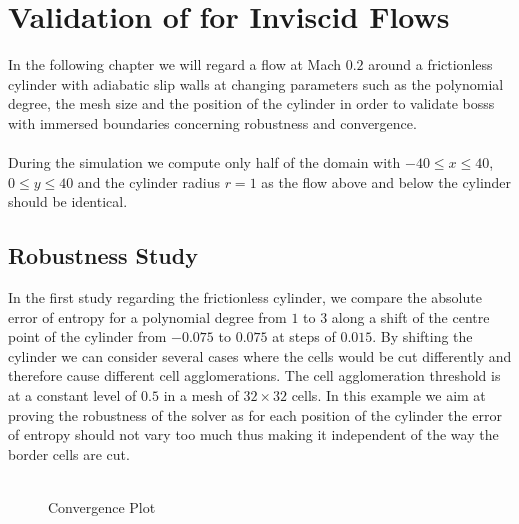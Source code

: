 \chapter{Validation of  for Inviscid Flows}
	\label{eulerVerification}
	In the following chapter we will regard a flow at Mach $0.2$ around a frictionless cylinder with adiabatic slip walls at changing parameters such as the polynomial degree, the mesh size and the position of the cylinder in order to validate \gls{bosss} with immersed boundaries concerning robustness and convergence.\\\\
	During the simulation we compute only half of the domain with $-40 \leq x \leq 40$, $0 \leq y \leq 40$ and the cylinder radius $r = 1$ as the flow above and below the cylinder should be identical.
	\section{Robustness Study}
	In the first study regarding the frictionless cylinder, we compare the absolute error of entropy for a polynomial degree from $1$ to $3$ along a shift of the centre point of the cylinder from $-0.075$ to $0.075$ at steps of $0.015$. By shifting the cylinder we can consider several cases where the cells would be cut differently and therefore cause different cell agglomerations. The cell agglomeration threshold is at a constant level of $0.5$ in a mesh of $32 \times 32$ cells. In this example we aim at proving the robustness of the solver as for each position of the cylinder the error of entropy should not vary too much thus making it independent of the way the border cells are cut. \\ \\

	\begin{figure}[htp]	
		\centering
		\caption{Convergence Plot}
		\label{shifterror}
	\end{figure}
	


